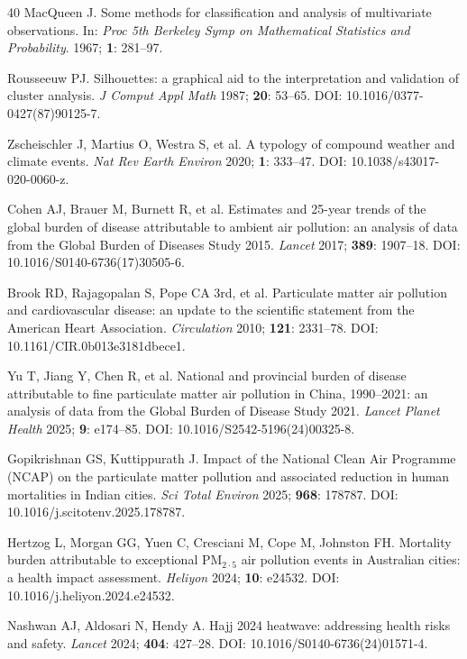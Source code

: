\documentclass[review,number]{elsarticle}
\begin{document}
\begin{thebibliography}{40}
MacQueen J.
Some methods for classification and analysis of multivariate observations.
In: \textit{Proc 5th Berkeley Symp on Mathematical Statistics and Probability}. 1967; \textbf{1}: 281--97.

Rousseeuw PJ.
Silhouettes: a graphical aid to the interpretation and validation of cluster analysis.
\textit{J Comput Appl Math} 1987; \textbf{20}: 53--65.
DOI: 10.1016/0377-0427(87)90125-7.

Zscheischler J, Martius O, Westra S, et al.
A typology of compound weather and climate events.
\textit{Nat Rev Earth Environ} 2020; \textbf{1}: 333--47.
DOI: 10.1038/s43017-020-0060-z.

Cohen AJ, Brauer M, Burnett R, et al.
Estimates and 25-year trends of the global burden of disease attributable to ambient air pollution: an analysis of data from the Global Burden of Diseases Study 2015.
\textit{Lancet} 2017; \textbf{389}: 1907--18.
DOI: 10.1016/S0140-6736(17)30505-6.

Brook RD, Rajagopalan S, Pope CA 3rd, et al.
Particulate matter air pollution and cardiovascular disease: an update to the scientific statement from the American Heart Association.
\textit{Circulation} 2010; \textbf{121}: 2331--78.
DOI: 10.1161/CIR.0b013e3181dbece1.

Yu T, Jiang Y, Chen R, et al.
National and provincial burden of disease attributable to fine particulate matter air pollution in China, 1990--2021: an analysis of data from the Global Burden of Disease Study 2021.
\textit{Lancet Planet Health} 2025; \textbf{9}: e174--85.
DOI: 10.1016/S2542-5196(24)00325-8.

Gopikrishnan GS, Kuttippurath J.
Impact of the National Clean Air Programme (NCAP) on the particulate matter pollution and associated reduction in human mortalities in Indian cities.
\textit{Sci Total Environ} 2025; \textbf{968}: 178787.
DOI: 10.1016/j.scitotenv.2025.178787.

Hertzog L, Morgan GG, Yuen C, Cresciani M, Cope M, Johnston FH.
Mortality burden attributable to exceptional $\text{PM}_{2{\cdot}5}$ air pollution events in Australian cities: a health impact assessment.
\textit{Heliyon} 2024; \textbf{10}: e24532.
DOI: 10.1016/j.heliyon.2024.e24532.

Nashwan AJ, Aldosari N, Hendy A.
Hajj 2024 heatwave: addressing health risks and safety.
\textit{Lancet} 2024; \textbf{404}: 427--28.
DOI: 10.1016/S0140-6736(24)01571-4.


\end{thebibliography}
\end{document}
